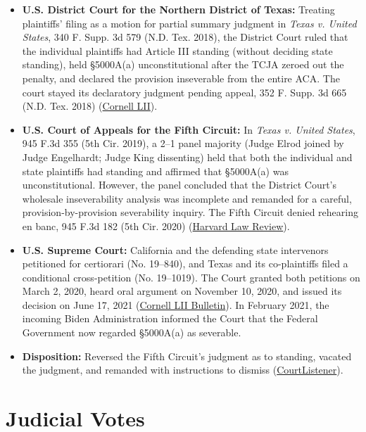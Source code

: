 \documentclass[12pt]{article}
\begin{document}
\begin{itemize}
  \item \textbf{U.S. District Court for the Northern District of Texas:} Treating plaintiffs' filing as a motion for partial summary judgment in \textit{Texas v. United States}, 340 F. Supp. 3d 579 (N.D. Tex. 2018), the District Court ruled that the individual plaintiffs had Article III standing (without deciding state standing), held \S 5000A(a) unconstitutional after the TCJA zeroed out the penalty, and declared the provision inseverable from the entire ACA. The court stayed its declaratory judgment pending appeal, 352 F. Supp. 3d 665 (N.D. Tex. 2018) (\href{https://www.law.cornell.edu/supremecourt/text/19-840}{Cornell LII}).
  \item \textbf{U.S. Court of Appeals for the Fifth Circuit:} In \textit{Texas v. United States}, 945 F.3d 355 (5th Cir. 2019), a 2--1 panel majority (Judge Elrod joined by Judge Engelhardt; Judge King dissenting) held that both the individual and state plaintiffs had standing and affirmed that \S 5000A(a) was unconstitutional. However, the panel concluded that the District Court's wholesale inseverability analysis was incomplete and remanded for a careful, provision-by-provision severability inquiry. The Fifth Circuit denied rehearing en banc, 945 F.3d 182 (5th Cir. 2020) (\href{https://harvardlawreview.org/print/vol-135/california-v-texas/}{Harvard Law Review}).
  \item \textbf{U.S. Supreme Court:} California and the defending state intervenors petitioned for certiorari (No. 19--840), and Texas and its co-plaintiffs filed a conditional cross-petition (No. 19--1019). The Court granted both petitions on March 2, 2020, heard oral argument on November 10, 2020, and issued its decision on June 17, 2021 (\href{https://www.law.cornell.edu/supct/cert/19-840}{Cornell LII Bulletin}). In February 2021, the incoming Biden Administration informed the Court that the Federal Government now regarded \S 5000A(a) as severable.
  \item \textbf{Disposition:} Reversed the Fifth Circuit's judgment as to standing, vacated the judgment, and remanded with instructions to dismiss (\href{https://www.courtlistener.com/opinion/4892571/california-v-texas/}{CourtListener}).
\end{itemize}

\section{Judicial Votes}
\end{document}
